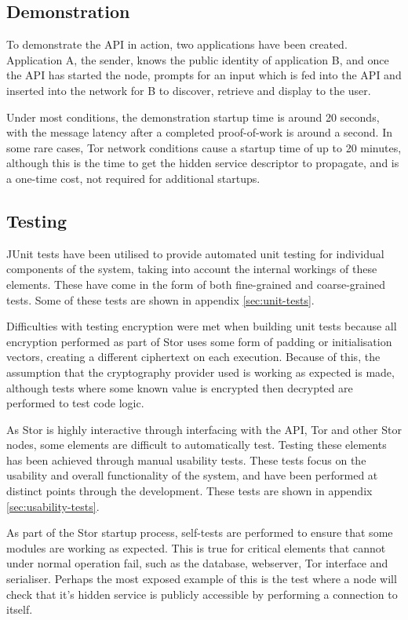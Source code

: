 	\subsection{Demonstration}
		To demonstrate the API in action, two applications have been created. Application A, the sender, knows the public identity of application B, and once the API has started the node, prompts for an input which is fed into the API and inserted into the network for B to discover, retrieve and display to the user.
		
		Under most conditions, the demonstration startup time is around 20 seconds, with the message latency after a completed proof-of-work is around a second. In some rare cases, Tor network conditions cause a startup time of up to 20 minutes, although this is the time to get the hidden service descriptor to propagate, and is a one-time cost, not required for additional startups.
	\subsection{Testing}
		JUnit tests have been utilised to provide automated unit testing for individual components of the system, taking into account the internal workings of these elements. These have come in the form of both fine-grained and coarse-grained tests. Some of these tests are shown in appendix \ref{sec:unit-tests}.
	
		Difficulties with testing encryption were met when building unit tests because all encryption performed as part of Stor uses some form of padding or initialisation vectors, creating a different ciphertext on each execution. Because of this, the assumption that the cryptography provider used is working as expected is made, although tests where some known value is encrypted then decrypted are performed to test code logic.
		
		As Stor is highly interactive through interfacing with the API, Tor and other Stor nodes, some elements are difficult to automatically test. Testing these elements has been achieved through manual usability tests. These tests focus on the usability and overall functionality of the system, and have been performed at distinct points through the development. These tests are shown in appendix \ref{sec:usability-tests}.
		
		As part of the Stor startup process, self-tests are performed to ensure that some modules are working as expected. This is true for critical elements that cannot under normal operation fail, such as the database, webserver, Tor interface and serialiser. Perhaps the most exposed example of this is the test where a node will check that it's hidden service is publicly accessible by performing a connection to itself.
		
